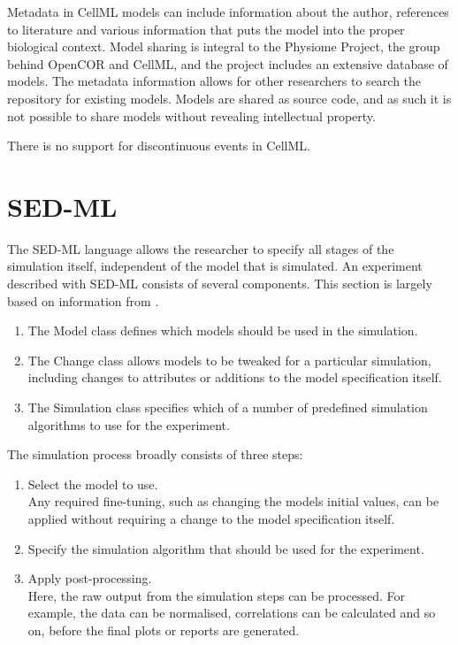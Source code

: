 \documentclass[\rootfolder/main.tex]{subfiles}
\begin{document}
Metadata in CellML models can include information about the author, references to literature and various information that puts the model into the proper biological context.
Model sharing is integral to the Physiome Project, the group behind OpenCOR and CellML, and the project includes an extensive database of models.
The metadata information allows for other researchers to search the repository for existing models.
Models are shared as source code, and as such it is not possible to share models without revealing intellectual property.

There is no support for discontinuous events in CellML.

\section{SED-ML}

The SED-ML language allows the researcher to specify all stages of the simulation itself, independent of the model that is simulated.
An experiment described with SED-ML consists of several components.
This section is largely based on information from \cite{sedml-specification}.

\begin{enumerate}
    \item The Model class defines which models should be used in the simulation.
    \item The Change class allows models to be tweaked for a particular simulation, including changes to attributes or additions to the model specification itself.
    \item The Simulation class specifies which of a number of predefined simulation algorithms to use for the experiment.
\end{enumerate}

The simulation process broadly consists of three steps:

\begin{enumerate}
    \item Select the model to use.\\
        Any required fine-tuning, such as changing the models initial values, can be applied without requiring a change to the model specification itself.
    \item Specify the simulation algorithm that should be used for the experiment.
    \item Apply post-processing.\\
        Here, the raw output from the simulation steps can be processed. For example, the data can be normalised,
        correlations can be calculated and so on, before the final plots or reports are generated.
\end{enumerate}
\end{document}
